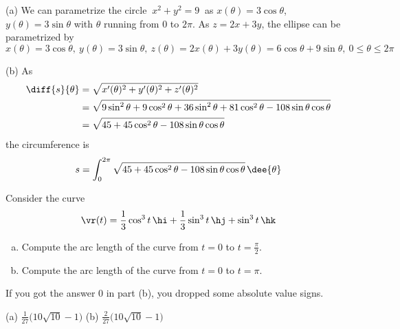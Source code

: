 \begin{solution} (a)
We can parametrize the circle  $\ x^2+y^2=9\ $ as 
$x(\theta)=3\cos\theta$, $y(\theta)=3\sin\theta$ with 
$\theta$ running from $0$ to $2\pi$. As $z=2x+3y$, the 
ellipse can be parametrized by
\begin{equation*}
x(\theta)=3\cos\theta,\ 
y(\theta)=3\sin\theta,\ 
z(\theta)=2x(\theta)+3 y(\theta)
        =6\cos\theta+9\sin\theta,\ 
0\le\theta\le 2\pi
\end{equation*}

(b)
As
\begin{align*}
\diff{s}{\theta}
 &=\sqrt{x'(\theta)^2+y'(\theta)^2+z'(\theta)^2}\\
 &=\sqrt{9\sin^2\theta+9\cos^2\theta+36\sin^2\theta
        +81\cos^2\theta-108\sin\theta\cos\theta}\\
&=\sqrt{45+45\cos^2\theta-108\sin\theta\cos\theta}
\end{align*}
the circumference is
\begin{equation*}
s=\int_0^{2\pi} \sqrt{45+45\cos^2\theta-108\sin\theta\cos\theta}\,\dee{\theta}
\end{equation*}
\end{solution}



\begin{question}[M317 2007A] %
	Consider the curve
	\begin{equation*}
	\vr(t) = \frac{1}{3}\cos^3 t\,\hi +\frac{1}{3} \sin^3 t\,\hj + \sin^3 t\,\hk
	\end{equation*}
	\begin{enumerate}[(a)]
		\item
		Compute the arc length of the curve from $t = 0$ to $t = \frac{\pi}{2}$.
		\item
		Compute the arc length of the curve from $t = 0$ to $t = \pi$.
	\end{enumerate}
\end{question}

\begin{hint} 
	If you got the answer $0$ in part (b), you dropped some absolute value signs.
\end{hint}

\begin{answer} 
	(a) $\frac{1}{27}\big(10\sqrt{10}-1\big)$\qquad
	(b) $\frac{2}{27}\big(10\sqrt{10}-1\big)$
\end{answer}

